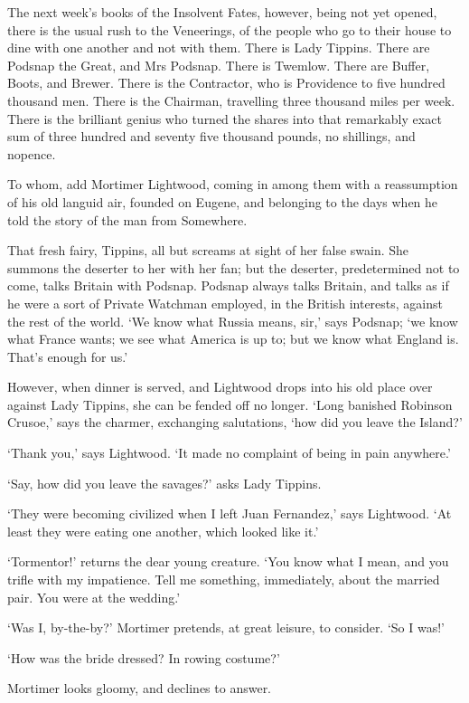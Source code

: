 The next week’s books of the Insolvent Fates, however, being not yet
opened, there is the usual rush to the Veneerings, of the people who go
to their house to dine with one another and not with them. There is Lady
Tippins. There are Podsnap the Great, and Mrs Podsnap. There is Twemlow.
There are Buffer, Boots, and Brewer. There is the Contractor, who
is Providence to five hundred thousand men. There is the Chairman,
travelling three thousand miles per week. There is the brilliant genius
who turned the shares into that remarkably exact sum of three hundred
and seventy five thousand pounds, no shillings, and nopence.

To whom, add Mortimer Lightwood, coming in among them with a
reassumption of his old languid air, founded on Eugene, and belonging to
the days when he told the story of the man from Somewhere.

That fresh fairy, Tippins, all but screams at sight of her false
swain. She summons the deserter to her with her fan; but the deserter,
predetermined not to come, talks Britain with Podsnap. Podsnap always
talks Britain, and talks as if he were a sort of Private Watchman
employed, in the British interests, against the rest of the world. ‘We
know what Russia means, sir,’ says Podsnap; ‘we know what France wants;
we see what America is up to; but we know what England is. That’s enough
for us.’

However, when dinner is served, and Lightwood drops into his old place
over against Lady Tippins, she can be fended off no longer. ‘Long
banished Robinson Crusoe,’ says the charmer, exchanging salutations,
‘how did you leave the Island?’

‘Thank you,’ says Lightwood. ‘It made no complaint of being in pain
anywhere.’

‘Say, how did you leave the savages?’ asks Lady Tippins.

‘They were becoming civilized when I left Juan Fernandez,’ says
Lightwood. ‘At least they were eating one another, which looked like
it.’

‘Tormentor!’ returns the dear young creature. ‘You know what I mean, and
you trifle with my impatience. Tell me something, immediately, about the
married pair. You were at the wedding.’

‘Was I, by-the-by?’ Mortimer pretends, at great leisure, to consider.
‘So I was!’

‘How was the bride dressed? In rowing costume?’

Mortimer looks gloomy, and declines to answer.

